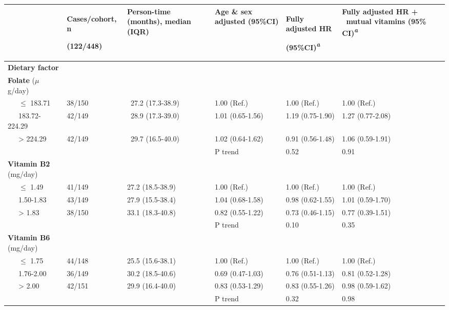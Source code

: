 \begin{landscape}
\small
{}
\label{table6_2}
\tablehead{}
\begin{supertabular}{m{4cm}m{2.5cm}m{3cm}m{3cm}m{3cm}m{3cm}}
\hline
~
 &
{\bfseries Cases/cohort, n}

 (122/448) &
\bfseries Person-time (months), median
(IQR) &
\bfseries Age \& sex adjusted (95\%CI)
&
{\bfseries Fully adjusted HR}


{\textbf{(95\%CI)}}{\textit{\textsuperscript{a}}}
&

{\textbf{Fully adjusted HR + \ mutual vitamins
(95\%
CI)}}{\textit{\textsuperscript{a}}}\\\hline
\bfseries Dietary factor &
~
 &
~
 &
~
 &
~
 &
~
\\\hline

{\textbf{Folate
}}{($\mu$g/day)} &
~
 &
~
 &
~
 &
~
 &
~
\\

{\ \ \ }{\textrm{${\leq}$}}{
183.71} &
 38/150 &
 \ 27.2 (17.3-38.9) &
 1.00 (Ref.) &
 1.00 (Ref.) &
 1.00 (Ref.)\\
 \ \ \ 183.72-224.29 &
 42/149 &
 \ 28.9 (17.3-39.0) &
 1.01 (0.65-1.56) &
 1.19 (0.75-1.90) &
 1.27 (0.77-2.08)\\
 \ \ \ {\textgreater} 224.29 &
 42/149 &
 \ 29.7 (16.5-40.0) &
 1.02 (0.64-1.62) &
 0.91 (0.56-1.48) &
 1.06 (0.59-1.91)\\
~
 &
~
 &
~
 &
 P trend &
 0.52 &
 0.91\\\hline

{\textbf{Vitamin
B2}}{ (mg/day)} &
~
 &
~
 &
~
 &
~
 &
~
\\

{\ \ \ }{\textrm{${\leq}$}}{
1.49} &
 41/149 &
 27.2 (18.5-38.9) &
 1.00 (Ref.) &
 1.00 (Ref.) &
 1.00 (Ref.)\\
 \ \ \ 1.50-1.83 &
 43/149 &
 27.9 (15.5-38.4) &
 1.04 (0.68-1.58) &
 0.98 (0.62-1.55) &
 1.01 (0.59-1.70)\\
 \ \ \ {\textgreater} 1.83 &
 38/150 &
 33.1 (18.3-40.8) &
 0.82 (0.55-1.22) &
 0.73 (0.46-1.15) &
 0.77 (0.39-1.51)\\
~
 &
~
 &
~
 &
 P trend &
 0.10 &
 0.35\\\hline

{\textbf{Vitamin
B6}}{ (mg/day)} &
~
 &
~
 &
~
 &
~
 &
~
\\

{\ \ \ }{\textrm{${\leq}$}}{
1.75} &
 44/148 &
 25.5 (15.6-38.1) &
 1.00 (Ref.) &
 1.00 (Ref.) &
 1.00 (Ref.)\\
 \ \ \ 1.76-2.00 &
 36/149 &
 30.2 (18.5-40.6) &
 0.69 (0.47-1.03) &
 0.76 (0.51-1.13) &
 0.81 (0.52-1.28)\\
 \ \ \ {\textgreater} 2.00 &
 42/151 &
 29.9 (16.4-40.0) &
 0.83 (0.53-1.29) &
 0.83 (0.55-1.26) &
 0.98 (0.59-1.62)\\
~
 &
~
 &
~
 &
 P trend &
 0.32 &
 0.98\\\hline


\end{supertabular}
\end{landscape}
